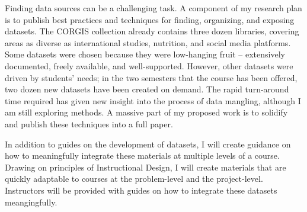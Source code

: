 Finding data sources can be a challenging task.
A component of my research plan is to publish best practices and techniques for finding, organizing, and exposing datasets.
The CORGIS collection already contains three dozen libraries, covering areas as diverse as international studies, nutrition, and social media platforms.
Some datasets were chosen because they were low-hanging fruit -- extensively documented, freely available, and well-supported. 
However, other datasets were driven by students' needs; in the two semesters that the course has been offered, two dozen new datasets have been created on demand.
The rapid turn-around time required has given new insight into the process of data mangling, although I am still exploring methods.
A massive part of my proposed work is to solidify and publish these techniques into a full paper.

In addition to guides on the development of datasets, I will create guidance on how to meaningfully integrate these materials at multiple levels of a course.
Drawing on principles of Instructional Design, I will create materials that are quickly adaptable to courses at the problem-level and the project-level.
Instructors will be provided with guides on how to integrate these datasets meangingfully.